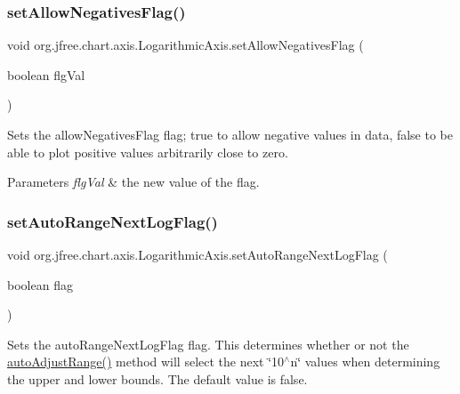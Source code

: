 \subsubsection{\texorpdfstring{set\+Allow\+Negatives\+Flag()}{setAllowNegativesFlag()}}
{\footnotesize\ttfamily void org.\+jfree.\+chart.\+axis.\+Logarithmic\+Axis.\+set\+Allow\+Negatives\+Flag (\begin{DoxyParamCaption}\item[{boolean}]{flg\+Val }\end{DoxyParamCaption})}

Sets the \textquotesingle{}allow\+Negatives\+Flag\textquotesingle{} flag; true to allow negative values in data, false to be able to plot positive values arbitrarily close to zero.


\begin{DoxyParams}{Parameters}
{\em flg\+Val} & the new value of the flag. \\
\hline
\end{DoxyParams}
\mbox{\label{classorg_1_1jfree_1_1chart_1_1axis_1_1_logarithmic_axis_a5ba0d016e248ba8da551cf62286d87a9}} 
\subsubsection{\texorpdfstring{set\+Auto\+Range\+Next\+Log\+Flag()}{setAutoRangeNextLogFlag()}}
{\footnotesize\ttfamily void org.\+jfree.\+chart.\+axis.\+Logarithmic\+Axis.\+set\+Auto\+Range\+Next\+Log\+Flag (\begin{DoxyParamCaption}\item[{boolean}]{flag }\end{DoxyParamCaption})}

Sets the \textquotesingle{}auto\+Range\+Next\+Log\+Flag\textquotesingle{} flag. This determines whether or not the \textquotesingle{}\mbox{\hyperlink{classorg_1_1jfree_1_1chart_1_1axis_1_1_logarithmic_axis_a0f54dfcb35d307b607012249d644b4a3}{auto\+Adjust\+Range()}}\textquotesingle{} method will select the next \char`\"{}10$^\wedge$n\char`\"{} values when determining the upper and lower bounds. The default value is false.


